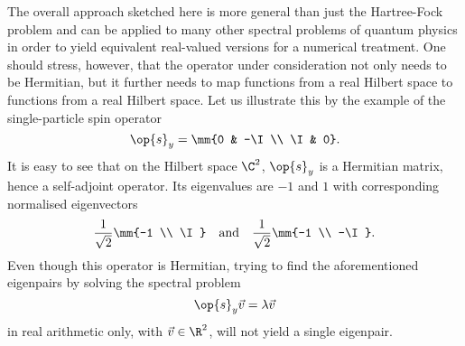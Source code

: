 The overall approach sketched here
is more general than just the Hartree-Fock problem
and can be applied to many other spectral problems of quantum physics
in order to yield equivalent real-valued versions for a numerical treatment.
One should stress, however,
that the operator under consideration not only needs to be Hermitian,
but it further
needs to map functions from a real Hilbert space
to functions from a real Hilbert space.
Let us illustrate this by the example of the single-particle spin operator
\[ \op{s}_y = \mm{0 & -\I \\ \I & 0}. \]
It is easy to see that on the Hilbert space $\C^2$,
$\op{s}_y$ is a Hermitian matrix, hence a self-adjoint operator.
Its eigenvalues are $-1$ and $1$ with corresponding normalised eigenvectors
\[ \frac{1}{\sqrt{2}} \mm{-1 \\ \I} \quad \text{and} \quad
  \frac{1}{\sqrt{2}} \mm{-1 \\ -\I}.
\]
Even though this operator is Hermitian,
trying to find the aforementioned eigenpairs by solving the spectral problem
\[ \op{s}_y \vec{v} = \lambda \vec{v} \]
in real arithmetic only, \ie with $\vec{v} \in \R^2$,
will not yield a single eigenpair.
